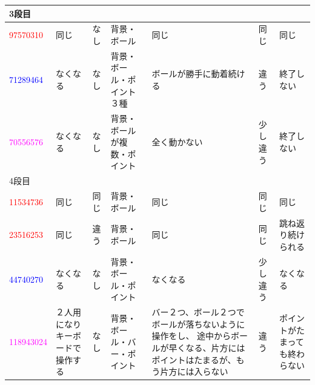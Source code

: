 \documentclass[a4paper,10pt,onecolumn,oneside,openany]{jsbook}
\begin{document}
\begin{table}[h]
\begin{center}
\begin{tabular}{|p{1.7cm}||p{1cm}|p{1cm}|p{1.7cm}|p{2cm}|p{1cm}|p{1.7cm}|}
3段目 &  &  &  &  &  &  \\ \hline
\textcolor{red}{97570310} & 同じ & なし & 背景・ボール & 同じ & 同じ & 同じ \\ \hline
\textcolor{blue}{71289464} & なくなる & なし & 背景・ボール・ポイント３種 & ボールが勝手に動着続ける & 違う & 終了しない \\ \hline
\textcolor{magenta}{70556576} & なくなる & なし & 背景・ボールが複数・ポイント & 全く動かない & 少し違う & 終了しない \\ \hline

4段目 &  &  &  &  &  &  \\ \hline
\textcolor{red}{11534736} & 同じ & 同じ & 背景・ボール & 同じ & 同じ & 同じ \\ \hline
\textcolor{red}{23516253} & 同じ & 違う & 背景・ボール & 同じ & 同じ & 跳ね返り続けられる \\ \hline
\textcolor{blue}{44740270} & なくなる & なし & 背景・ボール・ポイント & なくなる & 少し違う & なくなる \\ \hline
\textcolor{magenta}{118943024} & ２人用になりキーボードで操作する & なし & 背景・ボール・バー・ポイント & バー２つ、ボール２つでボールが落ちないように操作をし、 途中からボールが早くなる、片方にはポイントはたまるが、もう片方には入らない & 違う & ポイントがたまっても終わらない \\ \hline

\end{tabular}
\end{center}
\end{table}
\end{document}
